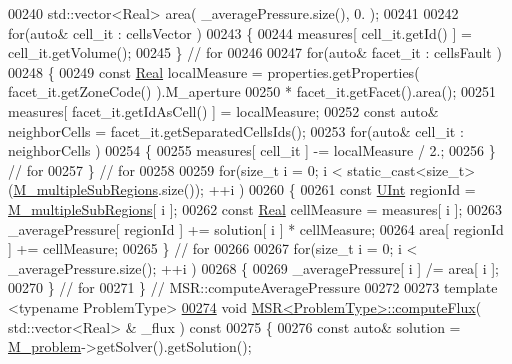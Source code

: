 \begin{DoxyCode}
00240     std::vector<Real> area( \_averagePressure.size(), 0. );
00241 
00242     \textcolor{keywordflow}{for}(\textcolor{keyword}{auto}& cell\_it : cellsVector )
00243     \{
00244         measures[ cell\_it.getId() ] = cell\_it.getVolume();
00245     \} \textcolor{comment}{// for}
00246 
00247     \textcolor{keywordflow}{for}(\textcolor{keyword}{auto}& facet\_it : cellsFault )
00248     \{
00249         \textcolor{keyword}{const} \hyperlink{namespaceFVCode3D_a40c1f5588a248569d80aa5f867080e83}{Real} localMeasure = properties.getProperties( facet\_it.getZoneCode() ).M\_aperture
00250                                   * facet\_it.getFacet().area();
00251         measures[ facet\_it.getIdAsCell() ] = localMeasure;
00252         \textcolor{keyword}{const} \textcolor{keyword}{auto}& neighborCells = facet\_it.getSeparatedCellsIds();
00253         \textcolor{keywordflow}{for}(\textcolor{keyword}{auto}& cell\_it : neighborCells )
00254         \{
00255             measures[ cell\_it ] -= localMeasure / 2.;
00256         \} \textcolor{comment}{// for}
00257     \} \textcolor{comment}{// for}
00258 
00259     \textcolor{keywordflow}{for}(\textcolor{keywordtype}{size\_t} i = 0; i < static\_cast<size\_t>(\hyperlink{classFVCode3D_1_1MSR_a38cba0138e4ebd055d47b3d9d9d32623}{M\_multipleSubRegions}.size()); ++i )
00260     \{
00261         \textcolor{keyword}{const} \hyperlink{namespaceFVCode3D_a4bf7e328c75d0fd504050d040ebe9eda}{UInt} regionId = \hyperlink{classFVCode3D_1_1MSR_a38cba0138e4ebd055d47b3d9d9d32623}{M\_multipleSubRegions}[ i ];
00262         \textcolor{keyword}{const} \hyperlink{namespaceFVCode3D_a40c1f5588a248569d80aa5f867080e83}{Real} cellMeasure = measures[ i ];
00263         \_averagePressure[ regionId ] += solution[ i ] * cellMeasure;
00264         area[ regionId ] += cellMeasure;
00265     \} \textcolor{comment}{// for}
00266 
00267     \textcolor{keywordflow}{for}(\textcolor{keywordtype}{size\_t} i = 0; i < \_averagePressure.size(); ++i )
00268     \{
00269         \_averagePressure[ i ] /= area[ i ];
00270     \} \textcolor{comment}{// for}
00271 \} \textcolor{comment}{// MSR::computeAveragePressure}
00272 
00273 \textcolor{keyword}{template} <\textcolor{keyword}{typename} ProblemType>
\hypertarget{MultipleSubRegions_8hpp_source.tex_l00274}{}\hyperlink{classFVCode3D_1_1MSR_ae29570a0d0d6767454ebf70f97e22f47}{00274} \textcolor{keywordtype}{void} \hyperlink{classFVCode3D_1_1MSR_ae29570a0d0d6767454ebf70f97e22f47}{MSR<ProblemType>::computeFlux}( std::vector<Real> & \_flux )\textcolor{keyword}{ const}
00275 \textcolor{keyword}{}\{
00276     \textcolor{keyword}{const} \textcolor{keyword}{auto}& solution = \hyperlink{classFVCode3D_1_1MSR_a531760a5415f63b7be6087ab117031e5}{M\_problem}->getSolver().getSolution();

\end{DoxyCode}
